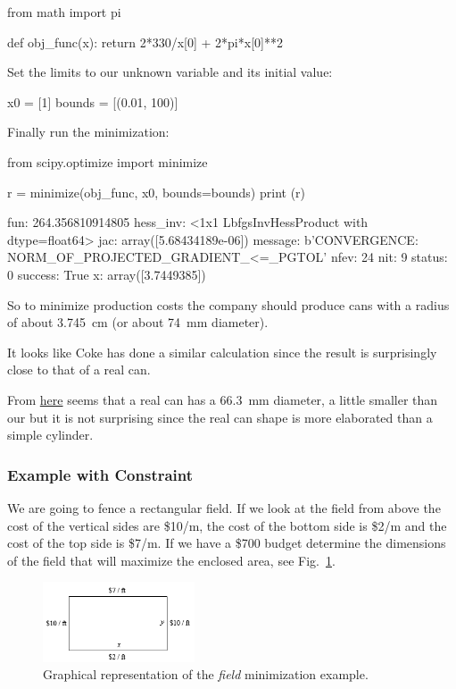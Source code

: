 \begin{ipython}
from math import pi

def obj_func(x):
    return 2*330/x[0] + 2*pi*x[0]**2
\end{ipython}
\noindent
Set the limits to our unknown variable and its initial value:

\begin{ipython}
x0 = [1]
bounds = [(0.01, 100)]
\end{ipython}
\noindent
Finally run the minimization:

\begin{ipython}
from scipy.optimize import minimize

r = minimize(obj_func, x0, bounds=bounds)
print (r)
\end{ipython}
\begin{ioutput}
      fun: 264.356810914805
 hess_inv: <1x1 LbfgsInvHessProduct with dtype=float64>
      jac: array([5.68434189e-06])
  message: b'CONVERGENCE: NORM_OF_PROJECTED_GRADIENT_<=_PGTOL'
     nfev: 24
      nit: 9
   status: 0
  success: True
        x: array([3.7449385])
\end{ioutput}
So to minimize production costs the company should produce cans with a radius of about 3.745~cm (or about 74~mm diameter).

\begin{curiosity}
It looks like Coke has done a similar calculation since the result is surprisingly close to that of a real can. 

From \href{	https://www.ball.com/eu/solutions/markets-capabilities/capabilities/beverage-cans/standard-range
}{here} seems that a real can has a 66.3~mm diameter, a little smaller than our but it is not surprising since the real can shape is more elaborated than a simple cylinder.
\end{curiosity}

\subsubsection{Example with Constraint}
\label{example-with-constraint}

We are going to fence a rectangular field. If we look at the field from above the cost of the vertical sides are \$10/m, the cost of the
bottom side is \$2/m and the cost of the top side is \$7/m. If we have a \$700 budget determine
the dimensions of the field that will maximize the enclosed area, see Fig.~\ref{fig:field}.

\begin{figure}[h]
\centering
\includegraphics[width=0.4\textwidth]{figures/field.png}
\caption{Graphical representation of the \emph{field} minimization example.}
\label{fig:field}
\end{figure}

